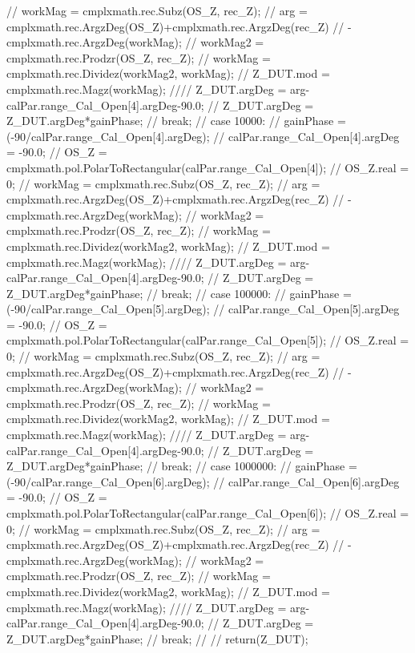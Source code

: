 {{//		workMag = cmplxmath.rec.Subz(OS_Z, rec_Z);
//		arg = cmplxmath.rec.ArgzDeg(OS_Z)+cmplxmath.rec.ArgzDeg(rec_Z)
//				-cmplxmath.rec.ArgzDeg(workMag);
//		workMag2 = cmplxmath.rec.Prodzr(OS_Z, rec_Z);
//		workMag = cmplxmath.rec.Dividez(workMag2, workMag);
//		Z_DUT.mod = cmplxmath.rec.Magz(workMag);
////		Z_DUT.argDeg = arg-calPar.range_Cal_Open[4].argDeg-90.0;
//		Z_DUT.argDeg = Z_DUT.argDeg*gainPhase;
//		break;
//	case 10000:
//		gainPhase = (-90/calPar.range_Cal_Open[4].argDeg);
//		calPar.range_Cal_Open[4].argDeg = -90.0;
//		OS_Z = cmplxmath.pol.PolarToRectangular(calPar.range_Cal_Open[4]);
//		OS_Z.real = 0;
//		workMag = cmplxmath.rec.Subz(OS_Z, rec_Z);
//		arg = cmplxmath.rec.ArgzDeg(OS_Z)+cmplxmath.rec.ArgzDeg(rec_Z)
//				-cmplxmath.rec.ArgzDeg(workMag);
//		workMag2 = cmplxmath.rec.Prodzr(OS_Z, rec_Z);
//		workMag = cmplxmath.rec.Dividez(workMag2, workMag);
//		Z_DUT.mod = cmplxmath.rec.Magz(workMag);
////		Z_DUT.argDeg = arg-calPar.range_Cal_Open[4].argDeg-90.0;
//		Z_DUT.argDeg = Z_DUT.argDeg*gainPhase;
//		break;
//	case 100000:
//		gainPhase = (-90/calPar.range_Cal_Open[5].argDeg);
//		calPar.range_Cal_Open[5].argDeg = -90.0;
//		OS_Z = cmplxmath.pol.PolarToRectangular(calPar.range_Cal_Open[5]);
//		OS_Z.real = 0;
//		workMag = cmplxmath.rec.Subz(OS_Z, rec_Z);
//		arg = cmplxmath.rec.ArgzDeg(OS_Z)+cmplxmath.rec.ArgzDeg(rec_Z)
//				-cmplxmath.rec.ArgzDeg(workMag);
//		workMag2 = cmplxmath.rec.Prodzr(OS_Z, rec_Z);
//		workMag = cmplxmath.rec.Dividez(workMag2, workMag);
//		Z_DUT.mod = cmplxmath.rec.Magz(workMag);
////		Z_DUT.argDeg = arg-calPar.range_Cal_Open[4].argDeg-90.0;
//		Z_DUT.argDeg = Z_DUT.argDeg*gainPhase;
//		break;
//	case 1000000:
//		gainPhase = (-90/calPar.range_Cal_Open[6].argDeg);
//		calPar.range_Cal_Open[6].argDeg = -90.0;
//		OS_Z = cmplxmath.pol.PolarToRectangular(calPar.range_Cal_Open[6]);
//		OS_Z.real = 0;
//		workMag = cmplxmath.rec.Subz(OS_Z, rec_Z);
//		arg = cmplxmath.rec.ArgzDeg(OS_Z)+cmplxmath.rec.ArgzDeg(rec_Z)
//				-cmplxmath.rec.ArgzDeg(workMag);
//		workMag2 = cmplxmath.rec.Prodzr(OS_Z, rec_Z);
//		workMag = cmplxmath.rec.Dividez(workMag2, workMag);
//		Z_DUT.mod = cmplxmath.rec.Magz(workMag);
////		Z_DUT.argDeg = arg-calPar.range_Cal_Open[4].argDeg-90.0;
//		Z_DUT.argDeg = Z_DUT.argDeg*gainPhase;
//		break;
//
//	}
	return(Z_DUT);
}

